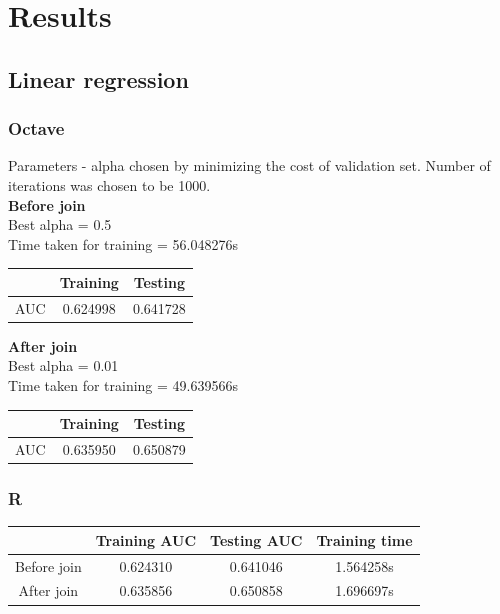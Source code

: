 \documentclass[10pt]{article}
\begin{document}
\section{Results}
\subsection{Linear regression}

\subsubsection{Octave}
Parameters - alpha chosen by minimizing the cost of validation set. Number of iterations was chosen to be 1000.\\
\textbf{Before join}\\
	Best alpha = 0.5 \\
	Time taken for training = 56.048276s

\begin{center}
 \begin{tabular}{|c | c | c ||} 
 \hline
 & Training & Testing\\ [0.5ex] 
 \hline\hline
AUC & 0.624998 & 0.641728\\
 \hline
\end{tabular}
\end{center}
\textbf{After join}\\
	Best alpha = 0.01 \\
	Time taken for training = 49.639566s
\begin{center}
 \begin{tabular}{|c | c | c ||} 
 \hline
 & Training & Testing\\ [0.5ex] 
 \hline\hline
AUC & 0.635950 & 0.650879\\
 \hline
\end{tabular}
\end{center}

\subsubsection{R}
\begin{center}
 \begin{tabular}{|c | c | c | c||} 
 \hline
 & Training AUC & Testing AUC & Training time\\ [0.5ex] 
 \hline\hline
Before join & 0.624310 & 0.641046 & 1.564258s\\
 \hline
After join & 0.635856 & 0.650858 & 1.696697s\\ 
 \hline
\end{tabular}
\end{center}
\end{document}
